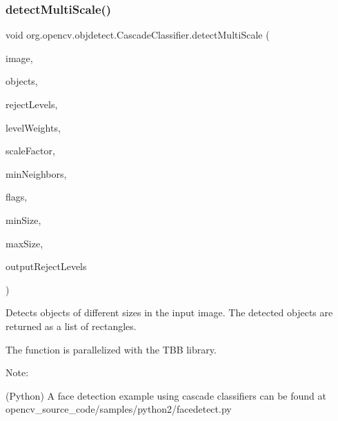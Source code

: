 \subsubsection{\texorpdfstring{detect\+Multi\+Scale()}{detectMultiScale()}\hspace{0.1cm}{\footnotesize\ttfamily [3/4]}}
{\footnotesize\ttfamily void org.\+opencv.\+objdetect.\+Cascade\+Classifier.\+detect\+Multi\+Scale (\begin{DoxyParamCaption}\item[{\mbox{\hyperlink{classorg_1_1opencv_1_1core_1_1_mat}{Mat}}}]{image,  }\item[{\mbox{\hyperlink{classorg_1_1opencv_1_1core_1_1_mat_of_rect}{Mat\+Of\+Rect}}}]{objects,  }\item[{\mbox{\hyperlink{classorg_1_1opencv_1_1core_1_1_mat_of_int}{Mat\+Of\+Int}}}]{reject\+Levels,  }\item[{\mbox{\hyperlink{classorg_1_1opencv_1_1core_1_1_mat_of_double}{Mat\+Of\+Double}}}]{level\+Weights,  }\item[{double}]{scale\+Factor,  }\item[{int}]{min\+Neighbors,  }\item[{int}]{flags,  }\item[{\mbox{\hyperlink{classorg_1_1opencv_1_1core_1_1_size}{Size}}}]{min\+Size,  }\item[{\mbox{\hyperlink{classorg_1_1opencv_1_1core_1_1_size}{Size}}}]{max\+Size,  }\item[{boolean}]{output\+Reject\+Levels }\end{DoxyParamCaption})}

Detects objects of different sizes in the input image. The detected objects are returned as a list of rectangles.

The function is parallelized with the T\+BB library.

Note\+:


\begin{DoxyItemize}
\item (Python) A face detection example using cascade classifiers can be found at opencv\+\_\+source\+\_\+code/samples/python2/facedetect.\+py 
\end{DoxyItemize}


